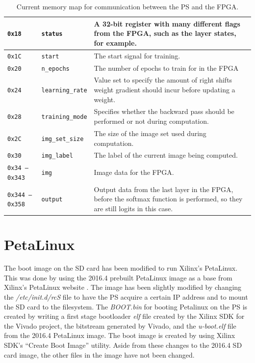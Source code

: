 \begin{table}
\begin{tabularx}{\textwidth}{|l| l| X|}
		\texttt{0x18} &
		\texttt{status} &
		A 32-bit register with many different flags from the FPGA, such as the layer states, for example. \\\hline 
		
		\texttt{0x1C} &
		\texttt{start} &
		The start signal for training. \\\hline 
		
		\texttt{0x20} &
		\texttt{n\_epochs} &
		The number of epochs to train for in the FPGA \\\hline 
		
		\texttt{0x24} &
		\texttt{learning\_rate} &
		Value set to specify the amount of right shifts weight gradient should incur before updating a weight. \\\hline 
		
		\texttt{0x28} &
		\texttt{training\_mode} &
		Specifies whether the backward pass should be performed or not during computation.\\\hline
		
		\texttt{0x2C} &
		\texttt{img\_set\_size} &
		The size of the image set used during computation. \\\hline 
		
		\texttt{0x30} &
		\texttt{img\_label} &
		The label of the current image being computed. \\\hline 
		
		\texttt{0x34 -- 0x343} &
		\texttt{img} &
		Image data for the FPGA. \\\hline
		
		\texttt{0x344 -- 0x358} &
		\texttt{output} &
		Output data from the last layer in the FPGA, before the softmax function is performed, so they are still logits in this case.\\\hline		
	\end{tabularx}	
	\caption{Current memory map for communication between the PS and the FPGA.}
	\label{tbl:mmio}
\end{table}

\section{PetaLinux}
The boot image on the SD card has been modified to run Xilinx's PetaLinux. This was done by using the 2016.4 prebuilt PetaLinux image as a base from Xilinx's PetaLinux website \cite{petalinux}. The image has been slightly modified by changing the \textit{/etc/init.d/rcS} file to have the PS acquire a certain IP address and to mount the SD card to the filesystem. The \textit{BOOT.bin} for booting Petalinux on the PS is created by writing a first stage bootloader \textit{elf} file created by the Xilinx SDK for the Vivado project, the bitstream generated by Vivado, and the \textit{u-boot.elf} file from the 2016.4 PetaLinux image. The boot image is created by using Xilinx SDK's ``Create Boot Image'' utility. Aside from these changes to the 2016.4 SD card image, the other files in the image have not been changed.

